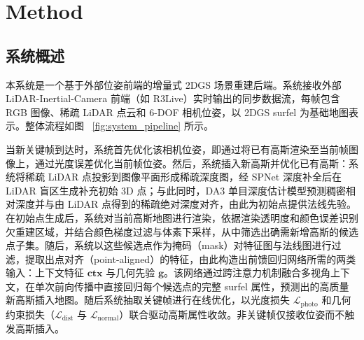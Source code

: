 
\section{Method}

\providecommand{\methodlead}[1]{\vspace{0.35em}\noindent\textit{#1}}

\subsection{系统概述}

本系统是一个基于外部位姿前端的增量式 2DGS 场景重建后端。系统接收外部 LiDAR-Inertial-Camera 前端（如 R3Live）实时输出的同步数据流，每帧包含 RGB 图像、稀疏 LiDAR 点云和 6-DOF 相机位姿，以 2DGS surfel 为基础地图表示。整体流程如图 ~\ref{fig:system_pipeline} 所示。

当新关键帧到达时，系统首先优化该相机位姿，即通过将已有高斯渲染至当前帧图像上，通过光度误差优化当前帧位姿。然后，系统插入新高斯并优化已有高斯：系统将稀疏 LiDAR 点投影到图像平面形成稀疏深度图，经 SPNet 深度补全后在 LiDAR 盲区生成补充初始 3D 点；与此同时，DA3 单目深度估计模型预测稠密相对深度并与由 LiDAR 点得到的稀疏绝对深度对齐，由此为初始点提供法线先验。在初始点生成后，系统对当前高斯地图进行渲染，依据渲染透明度和颜色误差识别欠重建区域，并结合颜色梯度过滤与体素下采样，从中筛选出确需新增高斯的候选点子集。随后，系统以这些候选点作为掩码（mask）对特征图与法线图进行过滤，提取出点对齐（point-aligned）的特征，由此构造出前馈回归网络所需的两类输入：上下文特征 $\mathbf{ctx}$ 与几何先验 $\mathbf{g}$。该网络通过跨注意力机制融合多视角上下文，在单次前向传播中直接回归每个候选点的完整 surfel 属性，预测出的高质量新高斯插入地图。随后系统抽取关键帧进行在线优化，以光度损失 $\mathcal{L}_{\text{photo}}$ 和几何约束损失（$\mathcal{L}_{\text{dist}}$ 与 $\mathcal{L}_{\text{normal}}$）联合驱动高斯属性收敛。非关键帧仅接收位姿而不触发高斯插入。

